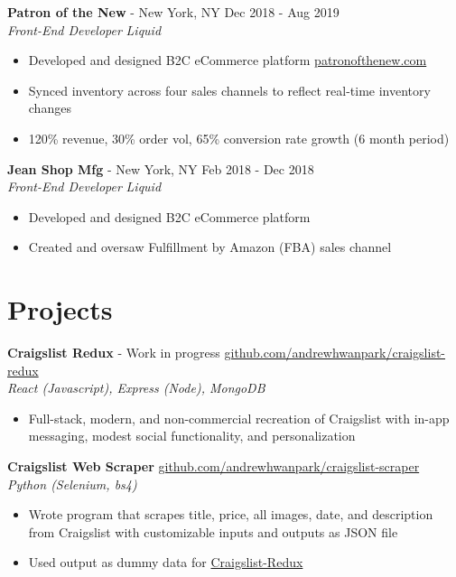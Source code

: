 \documentclass[margin]{res}
\begin{document}
\begin{resume}
{\bf Patron of the New} - New York, NY \hfill  Dec 2018 - Aug 2019\\
{\it Front-End Developer} \hfill {\it Liquid}
\begin{itemize} \itemsep -2pt %
    \item Developed and designed B2C eCommerce platform \hfill \href{https://patronofthenew.com}{patronofthenew.com}
    \item Synced inventory across four sales channels to reflect real-time inventory changes
    \item 120\% revenue, 30\% order vol, 65\% conversion rate growth (6 month period)
\end{itemize}

{\bf Jean Shop Mfg} - New York, NY \hfill Feb 2018 - Dec 2018\\
{\it Front-End Developer} \hfill {\it Liquid}
\begin{itemize} \itemsep -2pt
     \item Developed and designed B2C eCommerce platform
     \item Created and oversaw Fulfillment by Amazon (FBA) sales channel
 \end{itemize}

\section{Projects} 
{\bf Craigslist Redux} - Work in progress \hfill \href{https://github.com/andrewhwanpark/craigslist-redux}{github.com/andrewhwanpark/craigslist-redux}\\
{\it React (Javascript), Express (Node), MongoDB}
\begin{itemize} \itemsep -2pt
    \item Full-stack, modern, and non-commercial recreation of Craigslist with in-app messaging, modest social functionality, and personalization
\end{itemize}

{\bf Craigslist Web Scraper} \hfill \href{https://github.com/andrewhwanpark/craigslist-scraper}{github.com/andrewhwanpark/craigslist-scraper}\\
{\it Python (Selenium, bs4)}
\begin{itemize} \itemsep -2pt
    \item Wrote program that scrapes title, price, all images, date, and description from Craigslist with customizable inputs and outputs as JSON file
    \item Used output as dummy data for \href{https://github.com/andrewhwanpark/craigslist-redux}{Craigslist-Redux}
\end{itemize}


\end{resume}
\end{document}
